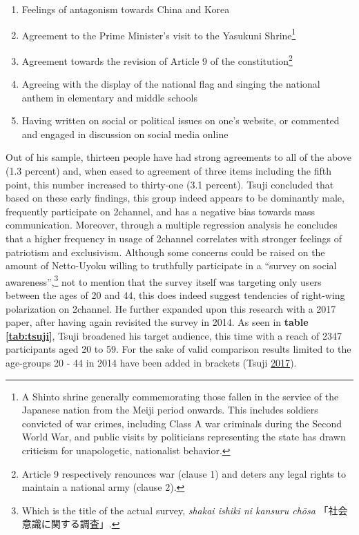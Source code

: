 \documentclass[10pt,british,A4paper,,openany]{memoir}
\providecommand{\tightlist}{%
  \setlength{\itemsep}{0pt}\setlength{\parskip}{0pt}}
\begin{document}
\begin{enumerate}
\def\labelenumi{\arabic{enumi}.}
\tightlist
\item
  Feelings of antagonism towards China and Korea
\item
  Agreement to the Prime Minister's visit to the Yasukuni
  Shrine\footnote{A Shinto shrine generally commemorating those fallen
    in the service of the Japanese nation from the Meiji period onwards.
    This includes soldiers convicted of war crimes, including Class A
    war criminals during the Second World War, and public visits by
    politicians representing the state has drawn criticism for
    unapologetic, nationalist behavior.}
\item
  Agreement towards the revision of Article 9 of the
  constitution\footnote{Article 9 respectively renounces war (clause 1)
    and deters any legal rights to maintain a national army (clause 2).}
\item
  Agreeing with the display of the national flag and singing the
  national anthem in elementary and middle schools
\item
  Having written on social or political issues on one's website, or
  commented and engaged in discussion on social media online
\end{enumerate}

Out of his sample, thirteen people have had strong agreements to all of
the above (1.3 percent) and, when eased to agreement of three items
including the fifth point, this number increased to thirty-one (3.1
percent). Tsuji concluded that based on these early findings, this group
indeed appears to be dominantly male, frequently participate on
2channel, and has a negative bias towards mass communication. Moreover,
through a multiple regression analysis he concludes that a higher
frequency in usage of 2channel correlates with stronger feelings of
patriotism and exclusivism. Although some concerns could be raised on
the amount of Netto-Uyoku willing to truthfully participate in a
``survey on social awareness'',\footnote{Which is the title of the
  actual survey, \emph{shakai ishiki ni kansuru chōsa}
  「社会意識に関する調査」.} not to mention that the survey itself was
targeting only users between the ages of 20 and 44, this does indeed
suggest tendencies of right-wing polarization on 2channel. He further
expanded upon this research with a 2017 paper, after having again
revisited the survey in 2014. As seen in \textbf{table \ref{tab:tsuji}},
Tsuji broadened his target audience, this time with a reach of 2347
participants aged 20 to 59. For the sake of valid comparison results
limited to the age-groups 20 - 44 in 2014 have been added in brackets
(Tsuji \protect\hyperlink{ref-tsuji_eng._2017}{2017}).
\end{document}
